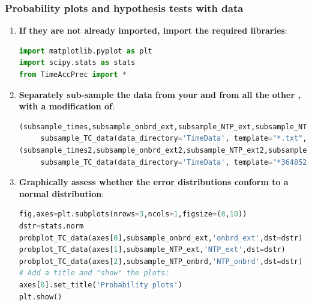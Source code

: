 \subsubsection{\howto Probability plots and hypothesis tests with \rtc data}
\begin{enumerate}
	\item \textbf{If they are not already imported, import the required \python libraries}:
\begin{lstlisting}[language=Python]
import matplotlib.pyplot as plt
import scipy.stats as stats
from TimeAccPrec import * 
\end{lstlisting}
	\item \textbf{Separately sub-sample the data from your \rtc and from all the other \rtcs, with a modification of}:
\begin{lstlisting}[language=Python]
(subsample_times,subsample_onbrd_ext,subsample_NTP_ext,subsample_NTP_onbrd)= \
     subsample_TC_data(data_directory='TimeData', template="*.txt",sub_samples=[0,3,6,9,12],exclude='3648523')
(subsample_times2,subsample_onbrd_ext2,subsample_NTP_ext2,subsample_NTP_onbrd2)= \
     subsample_TC_data(data_directory='TimeData', template="*3648523*.txt",sub_samples=[0,3,6,9,12])
\end{lstlisting}
	\item \textbf{Graphically assess whether the error distributions conform to a normal distribution}:
\begin{lstlisting}[language=Python]
fig,axes=plt.subplots(nrows=3,ncols=1,figsize=(8,10))
dstr=stats.norm
probplot_TC_data(axes[0],subsample_onbrd_ext,'onbrd_ext',dst=dstr)
probplot_TC_data(axes[1],subsample_NTP_ext,'NTP_ext',dst=dstr)
probplot_TC_data(axes[2],subsample_NTP_onbrd,'NTP_onbrd',dst=dstr)
# Add a title and "show" the plots:
axes[0].set_title('Probability plots')
plt.show()
\end{lstlisting}
	\begin{marginfigure}[0.cm]
	\begin{center}

\end{center}
\end{marginfigure}
\end{enumerate}
